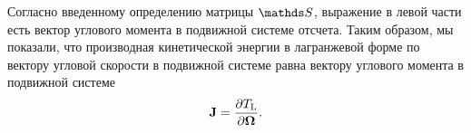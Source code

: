 \begin{subappendices}
    Согласно введенному определению матрицы $\bbS$, выражение в левой части есть вектор углового момента в подвижной системе отсчета. Таким образом, мы показали, что производная кинетической энергии в лагранжевой форме по вектору угловой скорости в подвижной системе равна вектору углового момента в подвижной системе
    \begin{gather}
        \mathbf{J} = \frac{\partial T_\text{L}}{\partial \boldsymbol{\Omega}}.
    \end{gather}
    
\end{subappendices}
